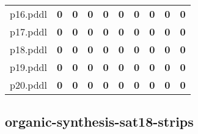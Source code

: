 \documentclass{article}
\begin{document}
\begin{tabular}{@{}lrrrrrrrrr@{}}
p16.pddl & \textbf{0} & \textbf{0} & \textbf{0} & \textbf{0} & \textbf{0} & \textbf{0} & \textbf{0} & \textbf{0} & \textbf{0} \\
p17.pddl & \textbf{0} & \textbf{0} & \textbf{0} & \textbf{0} & \textbf{0} & \textbf{0} & \textbf{0} & \textbf{0} & \textbf{0} \\
p18.pddl & \textbf{0} & \textbf{0} & \textbf{0} & \textbf{0} & \textbf{0} & \textbf{0} & \textbf{0} & \textbf{0} & \textbf{0} \\
p19.pddl & \textbf{0} & \textbf{0} & \textbf{0} & \textbf{0} & \textbf{0} & \textbf{0} & \textbf{0} & \textbf{0} & \textbf{0} \\
p20.pddl & \textbf{0} & \textbf{0} & \textbf{0} & \textbf{0} & \textbf{0} & \textbf{0} & \textbf{0} & \textbf{0} & \textbf{0} \\
\end{tabular}

\hypertarget{coverage-organic-synthesis-sat18-strips}{}
\subsection*{organic-synthesis-sat18-strips}
\end{document}
